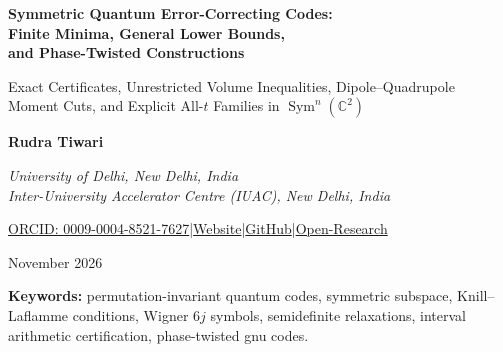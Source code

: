 \documentclass[11pt,letterpaper]{article}
\theoremstyle{definition}
\theoremstyle{remark}
\newcommand{\Sym}{\operatorname{Sym}}
\newcommand{\C}{\mathbb{C}}
\begin{document}
\thispagestyle{empty}
\begin{center}
\vspace*{0.22in}
{\LARGE\bfseries Symmetric Quantum Error-Correcting Codes:\\[.15em] Finite Minima, General Lower Bounds,\\[.15em] and Phase-Twisted Constructions\par}
\vspace{0.20in}
{\large Exact Certificates, Unrestricted Volume Inequalities, Dipole--Quadrupole\\[.1em] Moment Cuts, and Explicit All-$t$ Families in $\Sym^n(\C^2)$\par}
\vspace{0.24in}
{\normalsize\bfseries Rudra Tiwari\par}
\vspace{0.03in}
{\normalsize\itshape University of Delhi, New Delhi, India\\Inter-University Accelerator Centre (IUAC), New Delhi, India\par}
\vspace{0.10in}
{\small\href{https://orcid.org/0009-0004-8521-7627}{ORCID: 0009-0004-8521-7627}\quad|\quad\href{https://rtx09x.github.io/}{Website}\quad|\quad\href{https://github.com/Rtx09x}{GitHub}\quad|\quad\href{https://github.com/Rtx09x/Open-Research/tree/main/physics/symmetric-quantum-error-correction}{Open-Research}\par}
\vspace{0.15in}
{\normalsize November 2026\par}
\end{center}
\vspace{0.16in}
\begin{abstract}
We study the minimum length $n_{\min}(t)$ of a two-dimensional complex code in the fully symmetric $n$-qubit subspace that corrects arbitrary errors on up to $t$ qubits. First, we establish the volume bound $n+1\ge K(t+1)^2$ for logical dimension $K\ge2$, without a nondegeneracy assumption. For $K=2$ and $t\ge2$, we exclude equality using divisibility and finite modular obstructions. Second, we give a computer-assisted proof of $n_{\min}(2)=19$ using a three-copy partial-time-reversal certificate and the known 19-qubit code. We obtain $35\le n_{\min}(3)\le37$ and $50\le n_{\min}(4)\le61$. At $n=35$, an exact cubic moment inequality and a rational linear cut restrict the remaining feasible region. Third, phase-twisted codes give lengths $4t^2+2t$ for $t\ge10$, $4t^2-1$ for $t\ge36$, and $(2t+1)(2t-D)$ for positive integers $D$ with $t\ge10000D$. The last family gives leading coefficient $3.9998$. We also give an exact witness at $(t,n)=(20,1599)$ and obstructions for restricted amplitude families. We discuss the overlap between the $t=2$ minimum and Yuxuan Zhang's report; the $t=3$ cases $n=35,36$ remain open.
\end{abstract}
\vspace{0.10in}
\noindent\textbf{Keywords:} permutation-invariant quantum codes, symmetric subspace, Knill--Laflamme conditions, Wigner $6j$ symbols, semidefinite relaxations, interval arithmetic certification, phase-twisted gnu codes.
\clearpage
\tableofcontents
\clearpage
\end{document}
